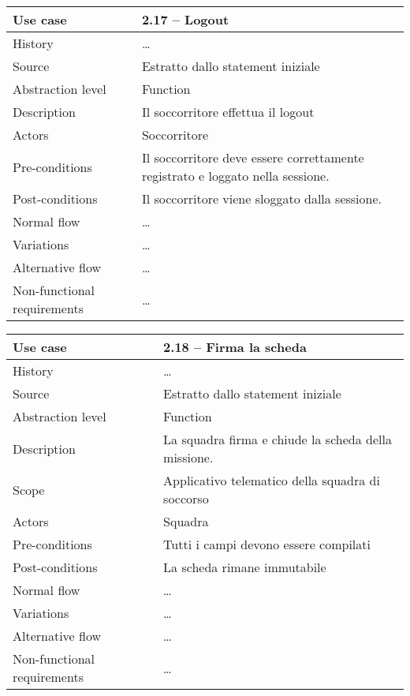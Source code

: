 \documentclass{article}
\begin{document}
    \begin{table}
        \begin{tabularx}{\textwidth}{l|X}
            Use case & 2.17 – Logout\\
            \hline
            History & \dots \\
            Source & Estratto dallo statement iniziale\\
            Abstraction level & Function\\
            Description & Il soccorritore effettua il logout\\
            Actors & Soccorritore\\
            Pre-conditions & Il soccorritore deve essere correttamente registrato e loggato nella sessione. \\
            Post-conditions & Il soccorritore viene sloggato dalla sessione. \\
            Normal flow & \dots \\
            Variations & \dots \\
            Alternative flow & \dots \\
            Non-functional requirements & \dots
        \end{tabularx}
        \label{tab:usecase2.17}
    \end{table}

    \begin{table}
        \begin{tabularx}{\textwidth}{l|X}
            Use case & 2.18 – Firma la scheda\\
            \hline
            History & \dots \\
            Source & Estratto dallo statement iniziale\\
            Abstraction level & Function\\
            Description & La squadra firma e chiude la scheda della missione.\\
            Scope & Applicativo telematico della squadra di soccorso\\
            Actors & Squadra\\
            Pre-conditions & Tutti i campi devono essere compilati \\
            Post-conditions & La scheda rimane immutabile \\
            Normal flow & \dots \\
            Variations & \dots \\
            Alternative flow & \dots \\
            Non-functional requirements & \dots
        \end{tabularx}
        \label{tab:usecase2.18}
    \end{table}
\end{document}
